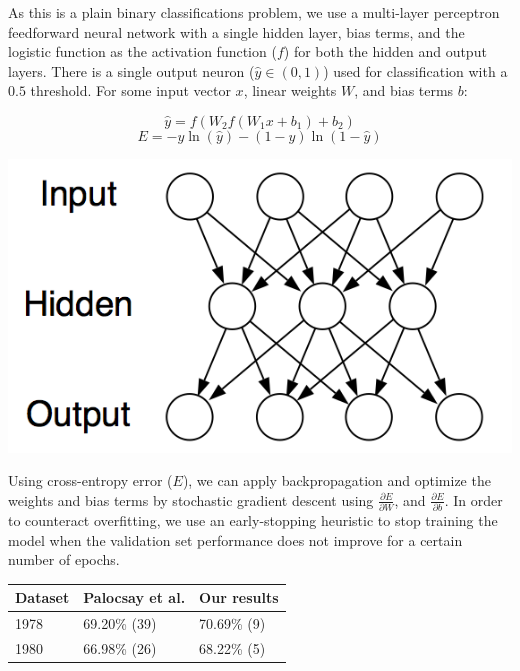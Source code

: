\documentclass[a0,landscape]{a0poster}
\begin{document}
\begin{multicols}{4}
As this is a plain binary classifications problem, we use a multi-layer perceptron feedforward neural network with a single hidden layer, bias terms, and the logistic function as the activation function ($f$) for both the hidden and output layers. There is a single output neuron ($\hat{y} \in (0, 1)$) used for classification with a $0.5$ threshold. For some input vector $x$, linear weights $W$, and bias terms $b$:

\[ \hat{y} = f( W_2  f( W_1 x + b_1 ) + b_2 ) \]
\[ E = - y \ln( \hat{y} ) - (1 - y) \ln ( 1 - \hat{y} ) \]

\begin{center}\vspace{1cm}
\includegraphics[width=0.8\linewidth]{neural_network}
\end{center}\vspace{1cm}

Using cross-entropy error ($E$), we can apply backpropagation and optimize the weights and bias terms by stochastic gradient descent using $\frac{\partial E}{\partial W}$, and $\frac{\partial E}{\partial b}$. In order to counteract overfitting, we use an early-stopping heuristic to stop training the model when the validation set performance does not improve for a certain number of epochs.

\begin{table} %
\begin{tabular}{l l l}
\toprule
\textbf{Dataset} & \textbf{Palocsay et al.} & \textbf{Our results}\\
\midrule
1978 & 69.20\% (39) & 70.69\% (9) \\
1980 & 66.98\% (26) & 68.22\% (5) \\
\bottomrule
\end{tabular}
\end{table}


\end{multicols}
\end{document}

